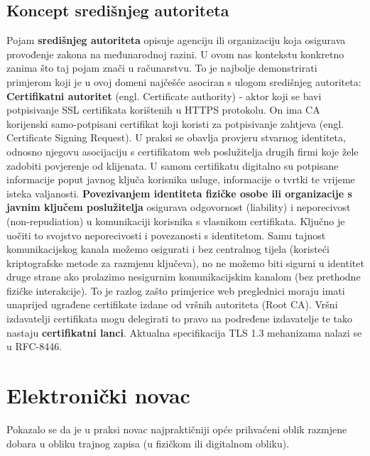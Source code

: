\documentclass[utf8, zavrsni]{fer}
\begin{document}
\section{Koncept središnjeg autoriteta}
Pojam \textbf{središnjeg autoriteta} opisuje agenciju ili organizaciju koja osigurava provođenje zakona na međunarodnoj razini\cite{enwiki:969028445}. U ovom nas kontekstu konkretno zanima što taj pojam znači u računarstvu. To je najbolje demonstrirati primjerom koji je u ovoj domeni najčešće asociran s ulogom središnjeg autoriteta: \textbf{Certifikatni autoritet} (engl. Certificate authority) - aktor koji se bavi potpisivanje SSL certifikata korištenih u HTTPS protokolu. On ima CA korijenski samo-potpisani certifikat koji koristi za potpisivanje zahtjeva (engl. Certificate Signing Request). U praksi se obavlja provjeru stvarnog identiteta, odnosno njegovu asocijaciju s certifikatom web poslužitelja drugih firmi koje žele zadobiti povjerenje od klijenata. U samom certifikatu digitalno su potpisane informacije poput javnog ključa korisnika usluge, informacije o tvrtki te vrijeme isteka valjanosti. \textbf{Povezivanjem identiteta fizičke osobe ili organizacije s javnim ključem poslužitelja} osigurava odgovornost (liability) i neporecivost (non-repudiation) u komunikaciji korisnika s vlasnikom certifikata. Ključno je uočiti to svojstvo neporecivosti i povezanosti s identitetom. Samu tajnost komunikacijskog kanala možemo osigurati i bez centralnog tijela (koristeći kriptografske metode za razmjenu ključeva), no ne možemo biti sigurni u identitet druge strane ako prolazimo nesigurnim komunikacijskim kanalom (bez prethodne fizičke interakcije). To je razlog zašto primjerice web preglednici moraju imati unaprijed ugrađene certifikate izdane od vršnih autoriteta (Root CA). Vršni izdavatelji certifikata mogu delegirati to pravo na podređene izdavatelje te tako nastaju \textbf{certifikatni lanci}. Aktualna specifikacija TLS 1.3 mehanizama nalazi se u RFC-8446.


\chapter{Elektronički novac}

Pokazalo se da je u praksi novac najpraktičniji opće prihvaćeni oblik razmjene dobara u obliku trajnog zapisa (u fizičkom ili digitalnom obliku).
\end{document}

